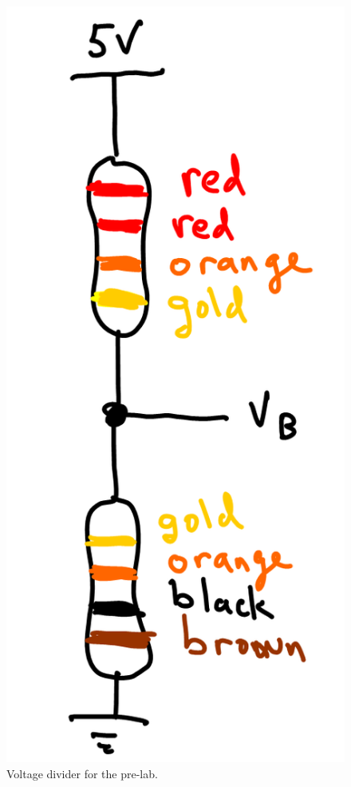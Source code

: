 \documentclass[11pt]{article} %
\begin{document}
\begin{enumerate}
\begin{figure}[htbp]
\begin{center}
\includegraphics{figures/prelab_divider}
\caption{Voltage divider for the pre-lab.}
\label{fig:voltage.divider.prelab}
\end{center}
\end{figure}

\end{enumerate}
\end{document}
